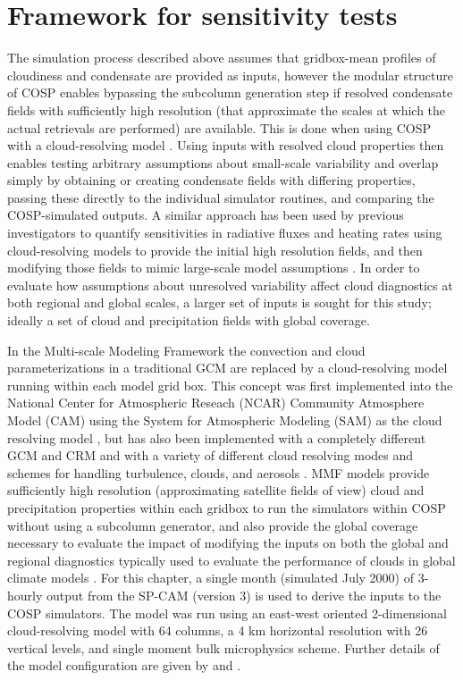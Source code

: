 \section{Framework for sensitivity tests}\label{sec:subgrid1Framework}

The simulation process described above assumes that gridbox-mean
profiles of cloudiness and condensate are provided as inputs, however
the modular structure of COSP enables bypassing the subcolumn generation
step if resolved condensate fields with sufficiently high resolution
(that approximate the scales at which the actual retrievals are
performed) are available. This is done when using COSP with a
cloud-resolving model
\citep[e.g.,][]{marchand_et_al_2009, marchand_and_ackerman_2010}. Using
inputs with resolved cloud properties then enables testing arbitrary
assumptions about small-scale variability and overlap simply by
obtaining or creating condensate fields with differing properties,
passing these directly to the individual simulator routines, and
comparing the COSP-simulated outputs. A similar approach has been used
by previous investigators to quantify sensitivities in radiative fluxes
and heating rates using cloud-resolving models to provide the initial
high resolution fields, and then modifying those fields to mimic
large-scale model assumptions
\citep[e.g.;][]{barker_et_al_1999, wu_and_liang_2005}. In order to
evaluate how assumptions about unresolved variability affect cloud
diagnostics at both regional and global scales, a larger set of inputs
is sought for this study; ideally a set of cloud and precipitation
fields with global coverage.

In the Multi-scale Modeling Framework \citep[MMF;][]{randall_et_al_2003}
the convection and cloud parameterizations in a traditional GCM are
replaced by a cloud-resolving model running within each model grid box.
This concept was first implemented into the National Center for
Atmospheric Reseach (NCAR) Community Atmosphere Model (CAM) using the
System for Atmospheric Modeling (SAM) as the cloud resolving model
\citep[SP-CAM;][]{khairoutdinov_and_randall_2001}, but has also been
implemented with a completely different GCM and CRM
\citep{tao_et_al_2009} and with a variety of different cloud resolving
modes and schemes for handling turbulence, clouds, and aerosols
\citep[e.g.;][]{cheng_and_xu_2011, cheng_and_xu_2013}. MMF models
provide sufficiently high resolution (approximating satellite fields of
view) cloud and precipitation properties within each gridbox to run the
simulators within COSP without using a subcolumn generator, and also
provide the global coverage necessary to evaluate the impact of
modifying the inputs on both the global and regional diagnostics
typically used to evaluate the performance of clouds in global climate
models \citep[e.g.;][]{gleckler_et_al_2008}. For this chapter, a single
month (simulated July 2000) of 3-hourly output from the SP-CAM (version
3) is used to derive the inputs to the COSP simulators. The model was
run using an east-west oriented 2-dimensional cloud-resolving model with
64 columns, a 4 km horizontal resolution with 26 vertical levels, and
single moment bulk microphysics scheme. Further details of the model
configuration are given by \citet{khairoutdinov_et_al_2005} and
\citet{marchand_et_al_2009}.

